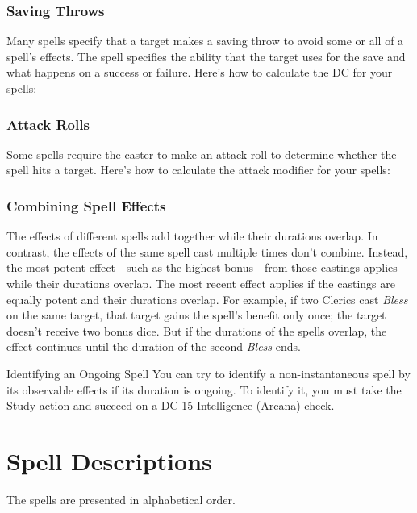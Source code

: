 \documentclass[10pt,a4paper,twoside,bg=print,twocolumn,openany,nodeprecatedcode]{dndbook}
\begin{document}
\subsubsection{Saving Throws}
Many spells specify that a target makes a saving throw to avoid some or all of a spell's effects. The spell specifies the ability that the target uses for the save and what happens on a success or failure. Here's how to calculate the DC for your spells:

\subsubsection{Attack Rolls}
Some spells require the caster to make an attack roll to determine whether the spell hits a target. Here's how to calculate the attack modifier for your spells:

\subsubsection{Combining Spell Effects}
The effects of different spells add together while their durations overlap. In contrast, the effects of the same spell cast multiple times don't combine. Instead, the most potent effect—such as the highest bonus—from those castings applies while their durations overlap. The most recent effect applies if the castings are equally potent and their durations overlap. For example, if two Clerics cast \textit{Bless} on the same target, that target gains the spell's benefit only once; the target doesn't receive two bonus dice. But if the durations of the spells overlap, the effect continues until the duration of the second \textit{Bless} ends.

\begin{DndSidebar}[float=!b]{Identifying an Ongoing Spell}
You can try to identify a non-instantaneous spell by its observable effects if its duration is ongoing. To identify it, you must take the Study action and succeed on a DC 15 Intelligence (Arcana) check.



\end{DndSidebar}

\section{Spell Descriptions}
The spells are presented in alphabetical order.
\end{document}
